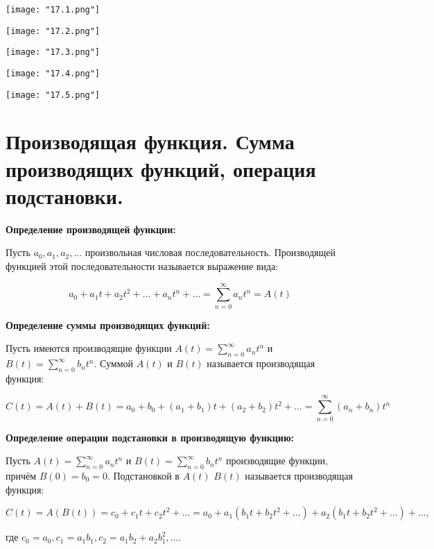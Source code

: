     \begin{center}
        \texttt{[image: "17.1.png"]}
        \bigskip

        \texttt{[image: "17.2.png"]}
        \bigskip

        \texttt{[image: "17.3.png"]}
        \bigskip

        \texttt{[image: "17.4.png"]}
        \bigskip

        \texttt{[image: "17.5.png"]}
        \bigskip
    \end{center}

\section{Производящая функция. Сумма производящих функций, операция подстановки.}    

\textbf{Определение производящей функции:}
    \smallskip

    Пусть $a_0, a_1, a_2, \dots$ произвольная числовая последовательность. Производящей
    функцией этой последовательности называется выражение вида:

    \[
        a_0 + a_1 t + a_2 t^2 + \dots + a_n t^n + \dots = \sum\limits^{\infty}_{n = 0}
        a_n t^n = A(t)  
    \]
    \bigskip

\textbf{Определение суммы производящих функций:}
    \smallskip

    Пусть имеются производящие функции $A(t) = \sum\limits^{\infty}_{n = 0} a_n t^n$
    и $B(t) = \sum\limits^{\infty}_{n = 0} b_n t^n$. Суммой $A(t)$ и $B(t)$
    называется производящая функция:

    \[
        C(t) = A(t) + B(t) = a_0 + b_0 + (a_1 + b_1)t + (a_2 + b_2)t^2 + \dots
        = \sum\limits^{\infty}_{n = 0} (a_n + b_n) t^n  
    \]
    \bigskip

\textbf{Определение операции подстановки в производящую функцию:}
    \smallskip
    
    Пусть $A(t) = \sum\limits^{\infty}_{n = 0} a_n t^n$ и $B(t) = \sum\limits^{\infty}_{n = 0}
    b_n t^n$ производящие функции, причём $B(0) = b_0 = 0$. Подстановкой в $A(t)$
    $B(t)$ называется производящая функция:

    \[
        C(t) = A(B(t)) = c_0 + c_1 t + c_2 t^2 + \dots =
        a_0 + a_1 (b_1 t + b_2 t^2 + \dots) + a_2 (b_1 t + b_2 t^2 + \dots) +
        \dots,
    \]
    
    где $c_0 = a_0, c_1 = a_1 b_1, c_2 = a_1 b_2 + a_2 b_1^2, \dots$.

